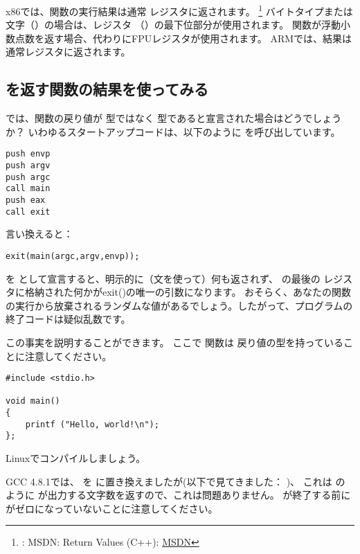 

x86では、関数の実行結果は通常 \EAX レジスタに返されます。
\footnote{\Seealso: MSDN: Return Values (C++): \href{http://go.yurichev.com/17258}{MSDN}}
バイトタイプまたは文字（\Tchar）の場合は、レジスタ \EAX （\AL）の最下位部分が使用されます。
関数が浮動小数点数を返す場合、代わりにFPUレジスタが使用されます。 
ARMでは、結果は通常レジスタに返されます。

\subsection{\Tvoid を返す関数の結果を使ってみる}

では、\main 関数の戻り値が \Tint 型ではなく \Tvoid 型であると宣言された場合はどうでしょうか？
いわゆるスタートアップコードは、以下のように \main を呼び出しています。

\begin{lstlisting}[style=customasmx86]
push envp
push argv
push argc
call main
push eax
call exit
\end{lstlisting}

言い換えると：

\begin{lstlisting}[style=customc]
exit(main(argc,argv,envp));
\end{lstlisting}

\main を \Tvoid として宣言すると、明示的に（文を使って）何も返されず、
\main の最後の \EAX レジスタに格納された何かがexit()の唯一の引数になります。
おそらく、あなたの関数の実行から放棄されるランダムな値があるでしょう。したがって、プログラムの終了コードは疑似乱数です。
\par
この事実を説明することができます。
ここで \main 関数は \Tvoid 戻り値の型を持っていることに注意してください。

\begin{lstlisting}[style=customc]
#include <stdio.h>

void main()
{
	printf ("Hello, world!\n");
};
\end{lstlisting}

Linuxでコンパイルしましょう。

GCC 4.8.1では、 \printf を \puts に置き換えましたが(以下で見てきました： )、
これは \printf のように \puts が出力する文字数を返すので、これは問題ありません。 
\main が終了する前に \EAX がゼロになっていないことに注意してください。

